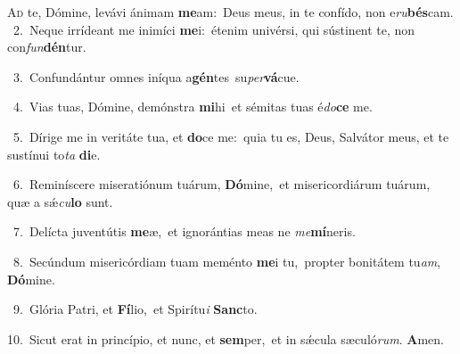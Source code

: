 \lettrine{\initial\textcolor{\initialcolor}{A}}{d} te, Dómine, levávi ánimam \textbf{me}\-am:~\star Deus meus, in te confído, non e\-\textit{ru}\-\textbf{bés}cam.\\
{\numbfont\textcolor{\numbcolor}{~2.}}~Neque irrídeant me inimíci \textbf{me}\-i:~\star étenim univérsi, qui sústinent te, non con\-\textit{fun}\-\textbf{dén}tur.\par
{\numbfont\textcolor{\numbcolor}{~3.}}~Confundántur omnes iníqua a\-\textbf{gén}\-tes~\star su\-\textit{per}\-\textbf{vá}cue.\par
{\numbfont\textcolor{\numbcolor}{~4.}}~Vias tuas, Dómine, demónstra \textbf{mi}\-hi~\star et sémitas tuas é\-\textit{do}\-\textbf{ce} me.\par
{\numbfont\textcolor{\numbcolor}{~5.}}~Dírige me in veritáte tua, et \textbf{do}\-ce me:~\star quia tu es, Deus, Salvátor meus, et te sustínui to\textit{ta} \textbf{di}\-e.\par
{\numbfont\textcolor{\numbcolor}{~6.}}~Reminíscere miseratiónum tuárum, \textbf{Dó}\-mine,~\star et misericordiárum tuárum, quæ a sǽ\-\textit{cu}\-\textbf{lo} sunt.\par
{\numbfont\textcolor{\numbcolor}{~7.}}~Delícta juventútis \textbf{me}\-æ,~\star et ignorántias meas ne \textit{me}\-\textbf{mí}neris.\par
{\numbfont\textcolor{\numbcolor}{~8.}}~Secúndum misericórdiam tuam meménto \textbf{me}\-i tu,~\star propter bonitátem tu\-\textit{am}\-, \textbf{Dó}\-mine.\par
{\numbfont\textcolor{\numbcolor}{~9.}}~Glória Patri, et \textbf{Fí}\-lio,~\star et Spirítu\textit{i} \textbf{Sanc}\-to.\par
{\numbfont\textcolor{\numbcolor}{10.}}~Sicut erat in princípio, et nunc, et \textbf{sem}\-per,~\star et in sǽcula sæculó\-\textit{rum}\-. \textbf{A}\-men.\par
